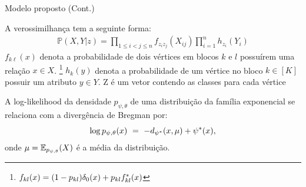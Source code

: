\documentclass[aspectratio=169]{beamer}
\begin{document}
\begin{frame}{Modelo proposto (Cont.)}
	\begin{minipage}{0.65\columnwidth}
	\begin{outline}
		\1 A verossimilhança tem a seguinte forma:
		\begin{align*}
			\mathbb{P} \left( X,Y | z \right) = \prod_{ 1\le i < j \le n } f_{z_i z_j}( X_{ij}) \prod_{i=1}^n h_{z_i} (Y_i)
		\end{align*}
		\1  $f_{k\ell}(x)$ denota a probabilidade de dois vértices em blocos $k$ e $l$ possuírem uma relação $x \in X$. 
		\footnote{$f_{kl}(x) = (1-p_{kl}) \delta_0(x) + p_{kl} f^*_{kl}(x)$}
		\1 $h_k(y)$ denota a probabilidade de um vértice no bloco $k \in [K]$ possuir um atributo $y \in Y$.
		\1 Z é um vetor contendo as classes para cada vértice		
	\end{outline}
\end{minipage}
\begin{minipage}{0.32\columnwidth}
A log-likelihood da densidade $p_{\psi, \theta}$ de uma distribuição da família exponencial se relaciona com a divergência de Bregman por:
\begin{equation*}
	\log p_{\psi, \theta}(x) \ = \  - d_{\psi^*}(x, \mu ) + \psi^*(x),
\end{equation*}
onde $\mu = \mathbb{E}_{p_{\psi, \theta}} (X)$ é a média da distribuição.
\end{minipage}
\end{frame}



\end{document}

